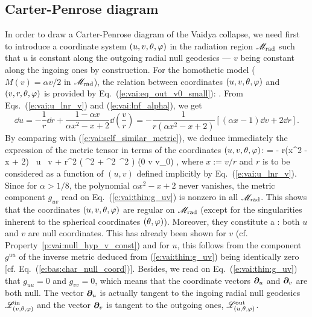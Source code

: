 \subsection{Carter-Penrose diagram} \label{f:vai:thin_CP}

In order to draw a Carter-Penrose diagram of the Vaidya collapse,
we need first to introduce a coordinate system $(u, v, \theta,\varphi)$
in the radiation region $\mathscr{M}_{\rm rad}$ such that
$u$ is constant along the outgoing radial null geodesics ---
$v$ being constant along the ingoing ones by construction.
For the homothetic model ($M(v) = \alpha v /2$ in $\mathscr{M}_{\rm rad}$),
the relation between coordinates $(u, v, \theta,\varphi)$ and
$(v, r, \theta, \varphi)$ is provided by Eq.~(\ref{e:vai:eq_out_v0_small}):
\be \label{e:vai:u_lnr_v}
    .
\ee
From Eqs.~(\ref{e:vai:u_lnr_v}) and (\ref{e:vai:lnf_alpha}), we get
\[
   \dd u = - \frac{1}{r} \dd r  +  \frac{1 - \alpha x}{\alpha x^2 - x + 2} \dd\left(\frac{v}{r}\right)
    = - \frac{1}{r(\alpha x^2 - x + 2)} \left[ (\alpha x - 1) \dd v + 2 \dd r \right] .
\]
By comparing with (\ref{e:vai:self_similar_metric}), we deduce immediately
the expression of the metric tensor in terms of the coordinates $(u,v,\theta,\varphi)$:
\be \label{e:vai:thin:g_uv}
     =  - r(\alpha x^2 - x + 2) \, \dd u \, \dd v
    + r^2 \left( \dd\th^2 + \sin^2\th\, \dd\ph^2 \right) \qquad
        (0 \leq v \leq v_0) ,
\ee
where $x := v/r$  and $r$ is to be considered as a function of $(u,v)$ defined implicitly
by Eq.~(\ref{e:vai:u_lnr_v}).
Since for $\alpha > 1/8$, the polynomial $\alpha x^2 - x + 2$ never vanishes,
the metric component $g_{uv}$ read on Eq.~(\ref{e:vai:thin:g_uv}) is
nonzero in all $\mathscr{M}_{\rm rad}$. This shows that
the coordinates $(u,v,\theta,\varphi)$ are regular on $\mathscr{M}_{\rm rad}$
(except for the singularities inherent to the spherical coordinates $(\theta,\varphi)$).
Moreover, they constitute a :
both $u$ and $v$ are null coordinates. This has already been shown for $v$
(cf. Property~\ref{p:vai:null_hyp_v_const}) and for $u$, this follows from
the component $g^{uu}$ of the inverse metric deduced from (\ref{e:vai:thin:g_uv})
being identically zero
[cf. Eq.~(\ref{e:bas:char_null_coord})]. Besides,
we read on Eq.~(\ref{e:vai:thin:g_uv}) that
$g_{uu} = 0$ and $g_{vv} = 0$, which means that the coordinate vectors $\bm{\partial}_u$
and $\bm{\partial}_v$ are both null. The vector $\bm{\partial}_u$ is actually tangent to the
ingoing radial null geodesics $\mathscr{L}^{\rm in}_{(v,\theta,\varphi)}$
and the vector $\bm{\partial}_v$ is tangent to the outgoing ones, $\mathscr{L}^{\rm out}_{(u,\theta,\varphi)}$.
